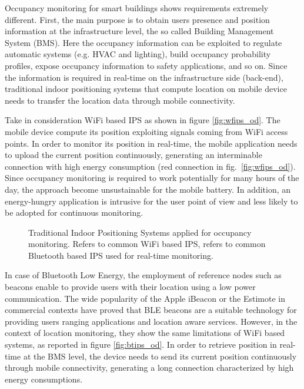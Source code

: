 \smallskip
Occupancy monitoring for smart buildings shows requirements extremely different. First, the main purpose is to obtain users presence and position information at the infrastructure level, the so called Building Management System (BMS). Here the occupancy information can be exploited to regulate automatic systems (e.g. HVAC and lighting), build occupancy probability profiles, expose occupancy information to safety applications, and so on.
Since the information is required in real-time on the infrastructure side (back-end), traditional indoor positioning systems that compute location on mobile device needs to transfer the location data through mobile connectivity.

Take in consideration WiFi based IPS as shown in figure \ref{fig:wfips_od}. The mobile device compute its position exploiting signals coming from WiFi access points. In order to monitor its position in real-time, the mobile application needs to upload the current position continuously, generating an interminable connection with high energy consumption (red connection in fig.~\ref{fig:wfips_od}). Since occupancy monitoring is required to work potentially for many hours of the day, the approach become unsustainable for the mobile battery. In addition, an energy-hungry application is intrusive for the user point of view and less likely to be adopted for continuous monitoring.


\begin{figure}
\centering
{}
\newline
{}
\caption[Traditional Indoor Positioning Systems applied for occupancy monitoring.]{Traditional Indoor Positioning Systems applied for occupancy monitoring. \protect{} Refers to common WiFi based IPS, \protect{} refers to common Bluetooth based IPS used for real-time monitoring.}
\label{fig:wfips_btips}
\end{figure}

In case of Bluetooth Low Energy, the employment of reference nodes such as beacons enable to provide users with their location using a low power communication. The wide popularity of the Apple iBeacon or the Estimote in commercial contexts have proved that BLE beacons are a suitable technology for providing users ranging applications and location aware services. However, in the context of location monitoring, they show the same limitations of WiFi based systems, as reported in figure \ref{fig:btips_od}. In order to retrieve position in real-time at the BMS level, the device needs to send its current position continuously through mobile connectivity, generating a long connection characterized by high energy consumptions.



